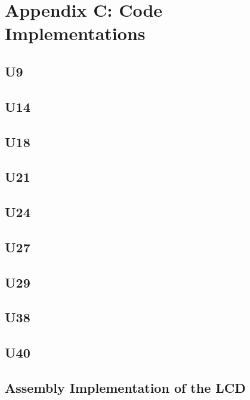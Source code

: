     \clearpage
    \newpage

    \section{Appendix C: Code Implementations} \label{appendix:code}

        \subsection{U9}


        \newpage
        \subsection{U14}


        \newpage
        \subsection{U18}


        \newpage
        \subsection{U21}


        \newpage
        \subsection{U24}


        \newpage
        \subsection{U27}


        \newpage
        \subsection{U29}


        \newpage
        \subsection{U38}


        \newpage
        \subsection{U40}


        \newpage
        \subsection{Assembly Implementation of the LCD} \label{sec:lcd_asm}


